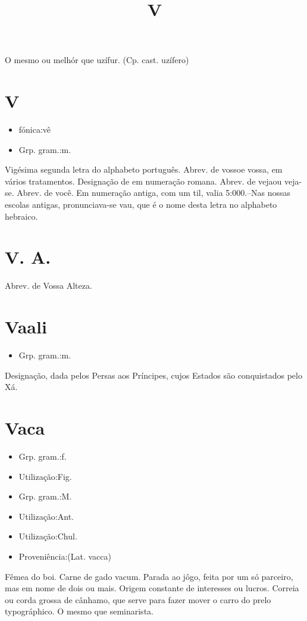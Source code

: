 \documentclass{article}
\title{V}
\begin{document}
O mesmo ou melhór que \textunderscore uzífur\textunderscore .
(Cp. cast. \textunderscore uzífero\textunderscore )
\section{V}
\begin{itemize}
\item {fónica:vê}
\end{itemize}
\begin{itemize}
\item {Grp. gram.:m.}
\end{itemize}
Vigésima segunda letra do alphabeto português.
Abrev. de \textunderscore vosso\textunderscore  e \textunderscore vossa\textunderscore , em vários tratamentos.
Designação de \textunderscore  em numeração romana.
Abrev. de \textunderscore veja\textunderscore  ou \textunderscore veja-se\textunderscore .
Abrev. de \textunderscore você\textunderscore .
Em numeração antiga, com um til, valia 5:000.--Nas nossas escolas antigas, pronunciava-se \textunderscore vau\textunderscore , que é o nome desta letra no alphabeto hebraico.
\section{V. A.}
Abrev. de \textunderscore Vossa Alteza\textunderscore .
\section{Vaali}
\begin{itemize}
\item {Grp. gram.:m.}
\end{itemize}
Designação, dada pelos Persas aos Príncipes, cujos Estados são conquistados pelo Xá.
\section{Vaca}
\begin{itemize}
\item {Grp. gram.:f.}
\end{itemize}
\begin{itemize}
\item {Utilização:Fig.}
\end{itemize}
\begin{itemize}
\item {Grp. gram.:M.}
\end{itemize}
\begin{itemize}
\item {Utilização:Ant.}
\end{itemize}
\begin{itemize}
\item {Utilização:Chul.}
\end{itemize}
\begin{itemize}
\item {Proveniência:(Lat. \textunderscore vacca\textunderscore )}
\end{itemize}
Fêmea do boi.
Carne de gado vacum.
Parada ao jôgo, feita por um só parceiro, mas em nome de dois ou mais.
Origem constante de interesses ou lucros.
Correia ou corda grossa de cânhamo, que serve para fazer mover o carro do prelo typográphico.
O mesmo que \textunderscore seminarista\textunderscore .
\end{document}
